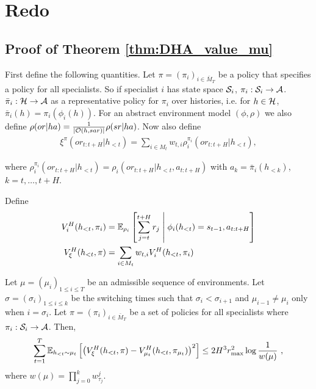     
    \newpage
    
    \section{Redo}
    \subsection{Proof of Theorem \ref{thm:DHA_value_mu}}
    
    First define the following quantities. Let $\pi = (\pi_i)_{i \in \bar{M}_T}$ be a policy that specifies a policy for all specialists. So if specialist $i$ has state space $\mathcal{S}_i$, $\pi_i: \mathcal{S}_i \to \mathcal{A}$. $\bar{\pi}_i: \mathcal{H} \to \mathcal{A}$ as a representative policy for $\pi_i$ over histories, i.e. for $h \in \mathcal{H}$, $\bar{\pi}_i(h) = \pi_i(\phi_i(h))$. For an abstract environment model $(\phi, \rho)$ we also define $\rho(or | ha) = \frac{1}{\lvert \mathcal{O}(h,sar) \rvert} \rho(sr | ha)$. Now also define
    \begin{align*}
        \xi^{\pi}(or_{t:t+H} | h_{<t}) = \sum_{i \in M_t} w_{t, i} \rho_i^{\pi_i}(or_{t:t+H} | h_{<t}),
    \end{align*}
    
    where $\rho_i^{\pi_i}(or_{t:t+H} | h_{<t}) = \rho_i(or_{t:t+H} | h_{<t}, a_{t:t+H})$ with $a_k = \bar{\pi}_i(h_{<k})$, $k = t, \ldots, t+H$.
    
    Define
    \begin{align*}
        V_{i}^{H}(h_{<t}, \pi_i) &= \mathbb{E}_{\rho_i}\left[ \sum_{j=t}^{t+H} r_j \;\middle|\; \phi_i(h_{<t}) = s_{t-1}, a_{t:t+H} \right]\\
        V_{\xi}^{H}(h_{<t}, \pi) &= \sum_{i \in M_t} w_{t, i} V_{i}^{H}(h_{<t}, \pi_i)
    \end{align*}
    
    
    \begin{T1}
        Let $\mu = (\mu_i)_{1 \leq i \leq T}$ be an admissible sequence of environments. Let $\sigma = (\sigma_i)_{1 \leq i \leq k}$ be the switching times such that $\sigma_i < \sigma_{i+1}$ and $\mu_{i-1} \neq \mu_{i}$ only when $i = \sigma_{i}$. Let $\pi = (\pi_i)_{i \in \bar{M}_T}$ be a set of policies for all specialists where $\pi_i: \mathcal{S}_i \to \mathcal{A}$. Then,
        \begin{align}
            \sum_{t=1}^{T} \mathbb{E}_{h_{<t} \sim \mu_t} \left[ \left( V_{\xi}^{H}(h_{<t}, \pi) - V_{\mu_{t}}^{H}(h_{<t}, \pi_{\mu_t}) \right)^2 \right] \leq 2 H^3 r_{\max}^2 \log \frac{1}{w(\mu)}~,
        \end{align}
        where $w(\mu) = \prod_{j=0}^{k} w_{\tau_j}^j$. 
    \end{T1}
    

